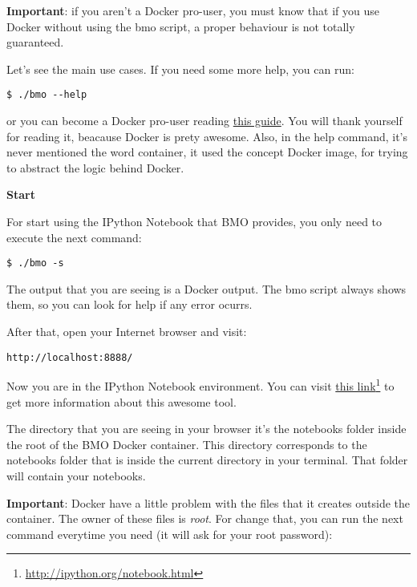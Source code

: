 \textbf{Important}: if you aren't a Docker pro-user, you must know that if you use Docker without using the bmo script, a proper behaviour is not totally guaranteed.

Let's see the main use cases. If you need some more help, you can run:

\vspace*{3mm}
\begin{lstlisting}
$ ./bmo --help
\end{lstlisting}

or you can become a Docker pro-user reading \href{https://docs.docker.com/userguide/}{this guide}. You will thank yourself for reading it, beacause Docker is prety awesome. Also, in the help command, it's never mentioned the word container, it used the concept Docker image, for trying to abstract the logic behind Docker.

\large
\textbf{Start}

\normalsize
For start using the IPython Notebook that BMO provides, you only need to execute the next command:

\vspace*{3mm}
\begin{lstlisting}
$ ./bmo -s
\end{lstlisting}

The output that you are seeing is a Docker output. The bmo script always shows them, so you can look for help if any error ocurrs.

After that, open your Internet browser and visit:

\vspace*{3mm}
\begin{lstlisting}
http://localhost:8888/
\end{lstlisting}

Now you are in the IPython Notebook environment. You can visit \href{http://ipython.org/notebook.html}{this link}\footnote{\url{http://ipython.org/notebook.html}} to get more information about this awesome tool.

The directory that you are seeing in your browser it's the notebooks folder inside the root of the BMO Docker container. This directory corresponds to the notebooks folder that is inside the current directory in your terminal. That folder will contain your notebooks.

\textbf{Important}: Docker have a little problem with the files that it creates outside the container. The owner of these files is \emph{root}. For change that, you can run the next command everytime you need (it will ask for your root password):

